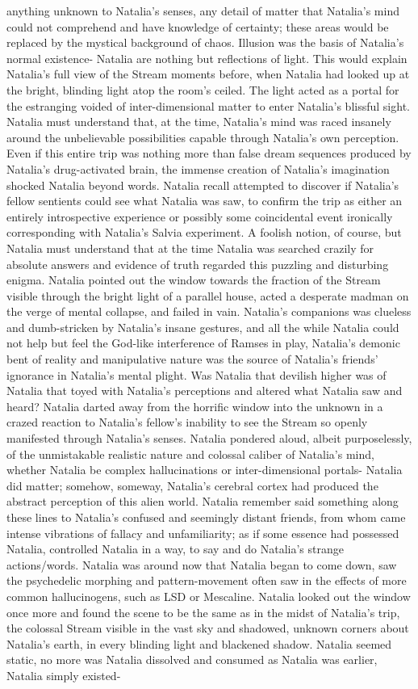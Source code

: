 \documentclass[12pt]{book}
\begin{document}
anything unknown to Natalia's senses, any detail of matter that Natalia's mind could not comprehend and have knowledge of certainty; these areas would be replaced by the mystical background of chaos. Illusion was the basis of Natalia's normal existence- Natalia are nothing but reflections of light. This would explain Natalia's full view of the Stream moments before, when Natalia had looked up at the bright, blinding light atop the room's ceiled. The light acted as a portal for the estranging voided of inter-dimensional matter to enter Natalia's blissful sight. Natalia must understand that, at the time, Natalia's mind was raced insanely around the unbelievable possibilities capable through Natalia's own perception. Even if this entire trip was nothing more than false dream sequences produced by Natalia's drug-activated brain, the immense creation of Natalia's imagination shocked Natalia beyond words. Natalia recall attempted to discover if Natalia's fellow sentients could see what Natalia was saw, to confirm the trip as either an entirely introspective experience or possibly some coincidental event ironically corresponding with Natalia's Salvia experiment. A foolish notion, of course, but Natalia must understand that at the time Natalia was searched crazily for absolute answers and evidence of truth regarded this puzzling and disturbing enigma. Natalia pointed out the window towards the fraction of the Stream visible through the bright light of a parallel house, acted a desperate madman on the verge of mental collapse, and failed in vain. Natalia's companions was clueless and dumb-stricken by Natalia's insane gestures, and all the while Natalia could not help but feel the God-like interference of Ramses in play, Natalia's demonic bent of reality and manipulative nature was the source of Natalia's friends' ignorance in Natalia's mental plight. Was Natalia that devilish higher was of Natalia that toyed with Natalia's perceptions and altered what Natalia saw and heard? Natalia darted away from the horrific window into the unknown in a crazed reaction to Natalia's fellow's inability to see the Stream so openly manifested through Natalia's senses. Natalia pondered aloud, albeit purposelessly, of the unmistakable realistic nature and colossal caliber of Natalia's mind, whether Natalia be complex hallucinations or inter-dimensional portals- Natalia did matter; somehow, someway, Natalia's cerebral cortex had produced the abstract perception of this alien world. Natalia remember said something along these lines to Natalia's confused and seemingly distant friends, from whom came intense vibrations of fallacy and unfamiliarity; as if some essence had possessed Natalia, controlled Natalia in a way, to say and do Natalia's strange actions/words. Natalia was around now that Natalia began to come down, saw the psychedelic morphing and pattern-movement often saw in the effects of more common hallucinogens, such as LSD or Mescaline. Natalia looked out the window once more and found the scene to be the same as in the midst of Natalia's trip, the colossal Stream visible in the vast sky and shadowed, unknown corners about Natalia's earth, in every blinding light and blackened shadow. Natalia seemed static, no more was Natalia dissolved and consumed as Natalia was earlier, Natalia simply existed- 
\end{document}
